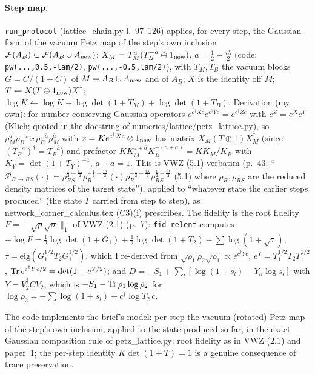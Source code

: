 \documentclass[11pt]{article}
\begin{document}
\paragraph{Step map.} \texttt{run\_protocol} (lattice\_chain.py l.~97--126) applies, for every step, the
Gaussian form of the vacuum Petz map of the step's own inclusion $\mathcal F(A_B)\subset\mathcal F(A_B\cup A_{\rm new})$:
$X_M=T_M^{a}(T_B^{-a}\oplus1_{\rm new})$, $a=\tfrac12-\tfrac{i\lambda}2$ (code: \texttt{pw(...,0.5,-lam/2)},
\texttt{pw(...,-0.5,lam/2)}), with $T_M,T_B$ the vacuum blocks $G=C/(1-C)$ of $M=A_B\cup A_{\rm new}$ and of
$A_B$; $X$ is the identity off $M$; $T\leftarrow X(T\oplus1_{\rm new})X^\dagger$; $\log K\leftarrow\log K-\log\det(1+T_M)+\log\det(1+T_B)$.
Derivation (my own): for number-conserving Gaussian operators $e^{c^\dagger Xc}e^{c^\dagger Yc}=e^{c^\dagger Zc}$
with $e^Z=e^Xe^Y$ (Klich; quoted in the docstring of numerics/lattice/petz\_lattice.py), so
$\rho_M^{a}\rho_B^{-a}\,x\,\rho_B^{-\bar a}\rho_M^{\bar a}$ with $x=Ke^{c^\dagger Xc}\otimes1_{\rm new}$ has matrix
$X_M(T\oplus1)X_M^\dagger$ (since $(T_B^{-a})^\dagger=T_B^{-\bar a}$) and prefactor
$K K_M^{a+\bar a}K_B^{-(a+\bar a)}=KK_M/K_B$ with $K_Y=\det(1+T_Y)^{-1}$, $a+\bar a=1$. This is VWZ (5.1)
verbatim (p.~43: ``$\mathcal P_{R\to RS}(\cdot)=\rho_{RS}^{\frac12-\frac{i\lambda}2}\rho_R^{-\frac12+\frac{i\lambda}2}(\cdot)
\rho_R^{-\frac12-\frac{i\lambda}2}\rho_{RS}^{\frac12+\frac{i\lambda}2}$ (5.1) where $\rho_R,\rho_{RS}$ are the reduced
density matrices of the target state''), applied to ``whatever state the earlier steps produced'' (the state $T$
carried from step to step), as network\_corner\_calculus.tex (C3)(i) prescribes. The fidelity is the root fidelity
$F=\lVert\sqrt\rho\sqrt\sigma\rVert_1$ of VWZ (2.1) (p.~7): \texttt{fid\_relent} computes
$-\log F=\frac12\log\det(1+G_1)+\frac12\log\det(1+T_2)-\sum\log(1+\sqrt{\tau})$, $\tau=\mathrm{eig}(G_1^{1/2}T_2G_1^{1/2})$,
which I re-derived from $\sqrt{\rho_1}\rho_2\sqrt{\rho_1}\propto e^{c^\dagger Yc}$, $e^{Y}=T_1^{1/2}T_2T_1^{1/2}$,
$\operatorname{Tr} e^{c^\dagger Yc/2}=\det(1+e^{Y/2})$; and $D=-S_1+\sum_l[\log(1+s_l)-Y_{ll}\log s_l]$ with
$Y=V_2^\dagger CV_2$, which is $-S_1-\operatorname{Tr}\rho_1\log\rho_2$ for $\log\rho_2=-\sum\log(1+s_l)+c^\dagger\log T_2\,c$.
\begin{verdictok}
The code implements the brief's model: per step the vacuum (rotated) Petz map of the step's own inclusion, applied
to the state produced so far, in the exact Gaussian composition rule of petz\_lattice.py; root fidelity as in VWZ
(2.1) and paper~1; the per-step identity $K\det(1+T)=1$ is a genuine consequence of trace preservation.
\end{verdictok}
\end{document}

